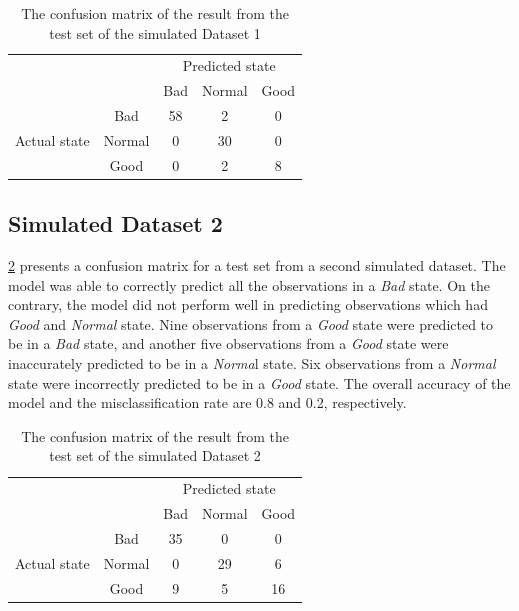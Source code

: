 \begin{table}[h]
\caption{The confusion matrix of the result from the test set of the simulated
Dataset 1}
\label{confusion}
\centering{}%
\begin{tabular}{ccccc}
 & \multirow{1}{*}{} & \multicolumn{3}{c}{Predicted state}\tabularnewline
\cmidrule{2-5} 
 &  & Bad & Normal & Good\tabularnewline
\cmidrule{2-5} 
\multirow{3}{*}{Actual state} & Bad & 58 & 2 & 0\tabularnewline
\cmidrule{2-5} 
 & Normal & 0 & 30 & 0\tabularnewline
\cmidrule{2-5} 
 & Good & 0 & 2 & 8\tabularnewline
\cmidrule{2-5} 
\end{tabular}
\end{table}


\subsection{Simulated Dataset 2}

\ref{confusion2} presents a confusion matrix for a test set from
a second simulated dataset. The model was able to correctly predict
all the observations in a \emph{Bad} state. On the contrary, the model
did not perform well in predicting observations which had \emph{Good}
and \emph{Normal} state. Nine observations from a \emph{Good} state
were predicted to be in a \emph{Bad} state, and another five observations
from a \emph{Good} state were inaccurately predicted to be in a \emph{Norma}l
state. Six observations from a \emph{Normal} state were incorrectly
predicted to be in a \emph{Good} state. The overall accuracy of the
model and the misclassification rate are 0.8 and 0.2, respectively. 

\begin{table}[h]
\caption{The confusion matrix of the result from the test set of the simulated
Dataset 2}
\label{confusion2}
\centering{}%
\begin{tabular}{ccccc}
 & \multirow{1}{*}{} & \multicolumn{3}{c}{Predicted state}\tabularnewline
\cmidrule{2-5} 
 &  & Bad & Normal & Good\tabularnewline
\cmidrule{2-5} 
\multirow{3}{*}{Actual state} & Bad & 35 & 0 & 0\tabularnewline
\cmidrule{2-5} 
 & Normal & 0 & 29 & 6\tabularnewline
\cmidrule{2-5} 
 & Good & 9 & 5 & 16\tabularnewline
\cmidrule{2-5} 
\end{tabular}
\end{table}


